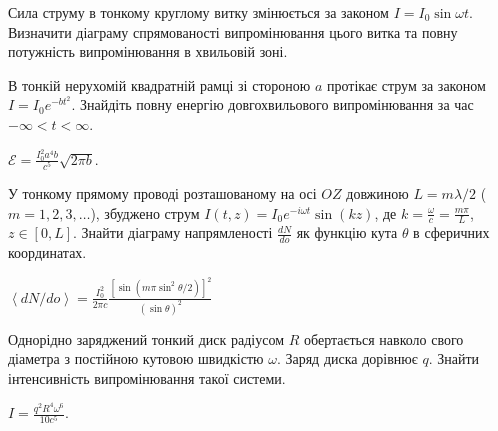 
\begin{problem}
Сила струму в тонкому круглому витку змінюється за законом $I = I_0 \sin\omega t$. Визначити діаграму спрямованості випромінювання цього витка та повну потужність випромінювання в хвильовій зоні.
\end{problem}

\begin{problem}
В тонкій нерухомій квадратній рамці зі стороною $a$ протікає струм за законом $I = I_0e^{-b t^2}$. Знайдіть повну енергію довгохвильового випромінювання за час $-\infty < t < \infty$.
\begin{solution}
	$\mathcal{E} = \frac{I_0^2a^4b}{c^5}\sqrt{2\pi b}$.
\end{solution}
\end{problem}


\begin{problem}
У тонкому прямому проводі розташованому на осі $OZ$  довжиною $L = m\lambda/2$ ($m = 1,2,3, \ldots$), збуджено струм $I(t,z) = I_0 e^{-i\omega t}\sin(kz)$, де $k = \frac{\omega}{c} = \frac{m\pi}{L}$, $z \in [0,L]$. Знайти діаграму напрямленості $\frac{dN}{do}$  як функцію кута $\theta$  в сферичних координатах.
\begin{solution}
	$\left\langle {dN/do} \right\rangle  = \frac{I_0^2}{2\pi c}\frac{\left[\sin(m\pi \sin^2\theta/2) \right]^2}{(\sin\theta)^2}$
\end{solution}
\end{problem}

\begin{problem}\label{prb:rad_rotated_disk}
Однорідно заряджений тонкий диск радіусом $R$ обертається навколо свого діаметра з постійною кутовою швидкістю $\omega$. Заряд диска дорівнює $q$. Знайти інтенсивність випромінювання такої системи.
\begin{solution}
	$I = \frac{q^2R^4\omega^6}{10c^5} $.
\end{solution}
\end{problem}

